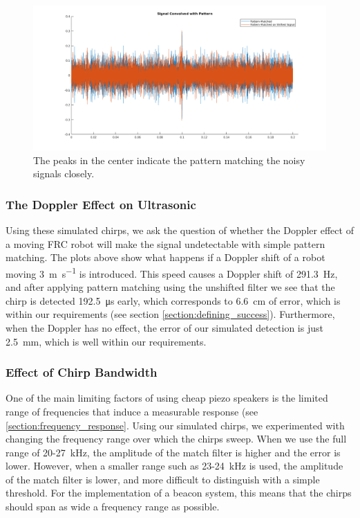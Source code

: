 \documentclass{article}
\begin{document}
    \begin{figure}
      \centering
      \includegraphics[width=1\linewidth]{./images/pattern_matching.png}
      \caption{The peaks in the center indicate the pattern matching the noisy signals closely.}
      \label{fig:pattern_matching}
    \end{figure}

    \subsubsection{The Doppler Effect on Ultrasonic}


      Using these simulated chirps, we ask the question of whether the Doppler effect of a moving FRC robot will make the signal undetectable with simple pattern matching. The plots above show what happens if a Doppler shift of a robot moving \SI{3}{\meter\per\second} is introduced. This speed causes a Doppler shift of \SI{291.3}{\hertz}, and after applying pattern matching using the unshifted filter we see that the chirp is detected \SI{192.5}{\micro\second} early, which corresponds to \SI{6.6}{\centi\meter} of error, which is within our requirements (see section \ref{section:defining_success}). Furthermore, when the Doppler has no effect, the error of our simulated detection is just \SI{2.5}{\milli\meter}, which is well within our requirements.

    \subsubsection{Effect of Chirp Bandwidth}

      One of the main limiting factors of using cheap piezo speakers is the limited range of frequencies that induce a measurable response (see \ref{section:frequency_response}. Using our simulated chirps, we experimented with changing the frequency range over which the chirps sweep. When we use the full range of 20-27\SI{}{\kilo\hertz}, the amplitude of the match filter is higher and the error is lower. However, when a smaller range such as 23-24\SI{}{\kilo\hertz} is used, the amplitude of the match filter is lower, and more difficult to distinguish with a simple threshold. For the implementation of a beacon system, this means that the chirps should span as wide a frequency range as possible.
\end{document}
